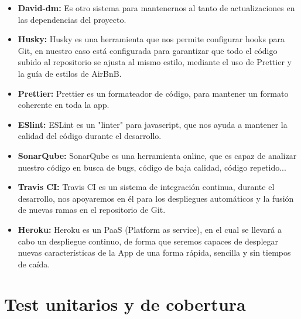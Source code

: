 \begin{itemize}
  \item \textbf{David-dm:} Es otro sistema para mantenernos al tanto de actualizaciones en las dependencias del proyecto.
  
  \item \textbf{Husky:} Husky es una herramienta que nos permite configurar hooks para Git, en nuestro caso está configurada para garantizar que todo el código subido al repositorio se ajusta al mismo estilo, mediante el uso de Prettier y la guía de estilos de AirBnB.
  
  \item \textbf{Prettier:} Prettier es un formateador de código, para mantener un formato coherente en toda la app. 
    \item \textbf{ESlint:} ESLint es un "linter" para javascript, que nos ayuda a mantener la calidad del código durante el desarrollo.
  
  \item \textbf{SonarQube:} SonarQube es una herramienta online, que es capaz de analizar nuestro código en busca de bugs, código de baja calidad, código repetido...
  
  \item \textbf{Travis CI:} Travis CI es un sistema de integración continua, durante el desarrollo, nos apoyaremos en él para los despliegues automáticos y la fusión de nuevas ramas en el repositorio de Git.
  
  \item \textbf{Heroku:} Heroku es un PaaS (Platform as service), en el cual se llevará a cabo un despliegue continuo, de forma que seremos capaces de desplegar nuevas características de la App de una forma rápida, sencilla y sin tiempos de caída.

\end{itemize}
\section {Test unitarios y de cobertura}
